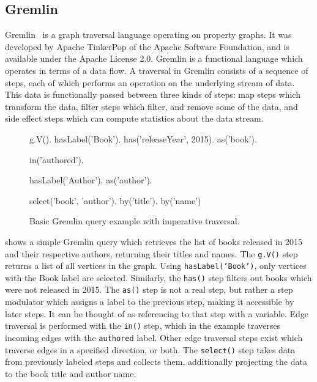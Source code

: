 \subsection{Gremlin}

Gremlin~\cite{gremlin} is a graph traversal language operating on property graphs.
It was developed by Apache TinkerPop of the Apache Software Foundation, and is available under the Apache License 2.0.
Gremlin is a functional language which operates in terms of a data flow.
A traversal in Gremlin consists of a sequence of steps, each of which performs an operation on the underlying stream of data.
This data is functionally passed between three kinds of steps: map steps which transform the data, filter steps which filter, and remove some of the data, and side effect steps which can compute statistics about the data stream.

\begin{figure}[ht]
\begin{code}[]
g.V().
    hasLabel('Book').
    has('releaseYear', 2015).
    as('book').
    
    in('authored').

    hasLabel('Author').
    as('author').

    select('book', 'author').
        by('title').
        by('name')
\end{code}
\caption{Basic Gremlin query example with imperative traversal.}
\label{fig:gremlinbasic}
\end{figure}

 shows a simple Gremlin query which retrieves the list of books released in 2015 and their respective authors, returning their titles and names.
The \texttt{g.V()} step returns a list of all vertices in the graph.
Using \texttt{hasLabel('Book')}, only vertices with the Book label are selected.
Similarly, the \texttt{has()} step filters out books which were not released in 2015.
The \texttt{as()} step is not a real step, but rather a step modulator which assigns a label to the previous step, making it accessible by later steps.
It can be thought of as referencing to that step with a variable.
Edge traversal is performed with the \texttt{in()} step, which in the example traverses incoming edges with the \texttt{authored} label.
Other edge traversal steps exist which traverse edges in a specified direction, or both.
The \texttt{select()} step takes data from previously labeled steps and collects them, additionally projecting the data to the book title and author name.


